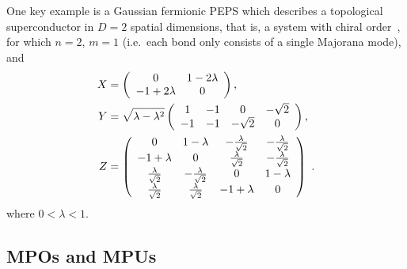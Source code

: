 \documentclass[rmp,aps,reprint,superscriptaddress,nobalancelastpage]{revtex4-1}
\let\endignorethis\relax
\def\TOCstop{\addtocontents{toc}{\ignorethis}}
\def\TOCstart{\addtocontents{toc}{\endignorethis}}
\begin{document}
    One key example is a Gaussian fermionic PEPS which describes a topological superconductor in $D=2$ spatial dimensions, that is, a system with chiral order~\cite{wahl:chiral-fPEPS,wahl:chiral-boundaries}, for which
$n=2$, $m=1$ (i.e.\ each bond only consists of a single Majorana mode), and
    \begin{align*}
        X & = \left(\begin{array}{cc}
                            0           & 1-2\lambda \\
                            -1+2\lambda & 0
                        \end{array}\right), \notag                                                                                               \\
        Y & =  \sqrt{\lambda - \lambda^2}\left(\begin{array}{cccc}
                                                       1  & -1 & 0         & -\sqrt{2} \\
                                                       -1 & -1 & -\sqrt{2} & 0
                                                   \end{array}\right), \notag                                                               \\
        Z & = \left(\begin{array}{cccc}
                            0                       & 1-\lambda                & -\frac{\lambda}{\sqrt 2} & -\frac{\lambda}{\sqrt{2}} \\
                            -1+\lambda              & 0                        & \frac{\lambda}{\sqrt 2}  & -\frac{\lambda}{\sqrt{2}} \\
                            \frac{\lambda}{\sqrt 2} & -\frac{\lambda}{\sqrt 2} & 0                        & 1-\lambda                 \\
                            \frac{\lambda}{\sqrt 2} & \frac{\lambda}{\sqrt 2}  & -1+\lambda               & 0
                        \end{array}\right) \ .
    \end{align*}
    where $0<\lambda<1$.




    \TOCstart
    \subsection{MPOs and MPUs\label{sec:app-examples:mpo-mpu}}
    \TOCstop
\end{document}
